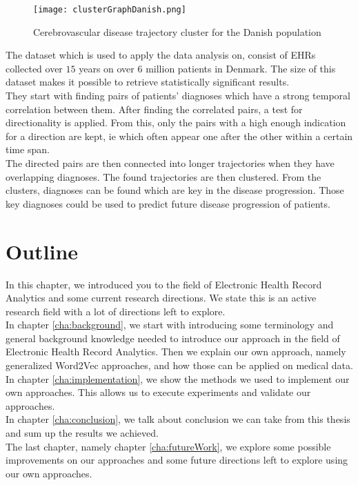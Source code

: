 \begin{figure}[!htb]
	\centering
	\texttt{[image: clusterGraphDanish.png]}
	\caption{Cerebrovascular disease trajectory cluster for the Danish population \cite{Brunak:article}}
	\label{fig:clusterGraphDanish}
\end{figure}

The dataset which is used to apply the data analysis on, consist of EHRs collected over $15$ years on over $6$ million patients in Denmark. The size of this dataset makes it possible to retrieve statistically significant results. \\

They start with finding pairs of patients' diagnoses which have a strong temporal correlation between them. After finding the correlated pairs, a test for directionality is applied. From this, only the pairs with a high enough indication for a direction are kept, ie which often appear one after the other within a certain time span. \\

The directed pairs are then connected into longer trajectories when they have overlapping diagnoses. The found trajectories are then clustered. From the clusters, diagnoses can be found which are key in the disease progression. Those key diagnoses could be used to predict future disease progression of patients. 



\section{Outline}
\label{sec:outline}

In this chapter, we introduced you to the field of Electronic Health Record Analytics and some current research directions. We state this is an active research field with a lot of directions left to explore. \\
In chapter \ref{cha:background}, we start with introducing some terminology and general background knowledge needed to introduce our approach in the field of Electronic Health Record Analytics. Then we explain our own approach, namely generalized Word2Vec approaches, and how those can be applied on medical data. \\
In chapter \ref{cha:implementation}, we show the methods we used to implement our own approaches. This allows us to execute experiments and validate our approaches. \\
In chapter \ref{cha:conclusion}, we talk about conclusion we can take from this thesis and sum up the results we achieved. \\
The last chapter, namely chapter \ref{cha:futureWork}, we explore some possible improvements on our approaches and some future directions left to explore using our own approaches.


